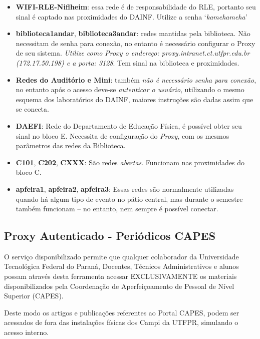 \documentclass[a4paper,12pt,openany]{article}
\begin{document}
\begin{itemize}
\item \textbf{WIFI-RLE-Niflheim}: essa rede é de responsabilidade do RLE, portanto seu sinal é captado nas proximidades do DAINF. Utilize a senha ‘\textit{kamehameha}’

\item \textbf{biblioteca1andar}, \textbf{biblioteca3andar}: redes mantidas pela biblioteca. Não necessitam de senha para conexão, no entanto é necessário configurar o Proxy de seu sistema. \textit{Utilize como Proxy o endereço: proxy.intranet.ct.utfpr.edu.br (172.17.50.198) e a porta: 3128}. Tem sinal na biblioteca e proximidades.

\item\textbf{Redes do Auditório e Mini}: também \textit{não é necessário senha para conexão}, no entanto após o acesso deve-se \textit{autenticar o usuário}, utilizando o mesmo esquema dos laboratórios do DAINF, maiores instruções são dadas assim que se conecta.

\item \textbf{DAEFI}: Rede do Departamento de Educação Física, é possível obter seu sinal no bloco E. Necessita de configuração do \textit{Proxy}, com os mesmos parâmetros das redes da Biblioteca.

\item \textbf{C101}, \textbf{C202}, \textbf{CXXX}:  São redes \textit{abertas}. Funcionam nas proximidades do bloco C.

\item \textbf{apfeira1}, \textbf{apfeira2}, \textbf{apfeira3}: Essas redes são normalmente utilizadas quando há algum tipo de evento no pátio central, mas durante o semestre também funcionam – no entanto, nem sempre é possível conectar.

\end{itemize}

\subsection{Proxy Autenticado - Periódicos CAPES}

O serviço disponibilizado permite que qualquer colaborador da Universidade Tecnológica Federal do Paraná, Docentes, Técnicos Administrativos e alunos possam através desta ferramenta acessar EXCLUSIVAMENTE os materiais disponibilizados pela Coordenação de Aperfeiçoamento de Pessoal de Nível Superior (CAPES).

Deste modo os artigos e publicações referentes ao Portal CAPES, podem ser acessados de fora das instalações físicas dos Campi da UTFPR, simulando o acesso interno.
\end{document}
